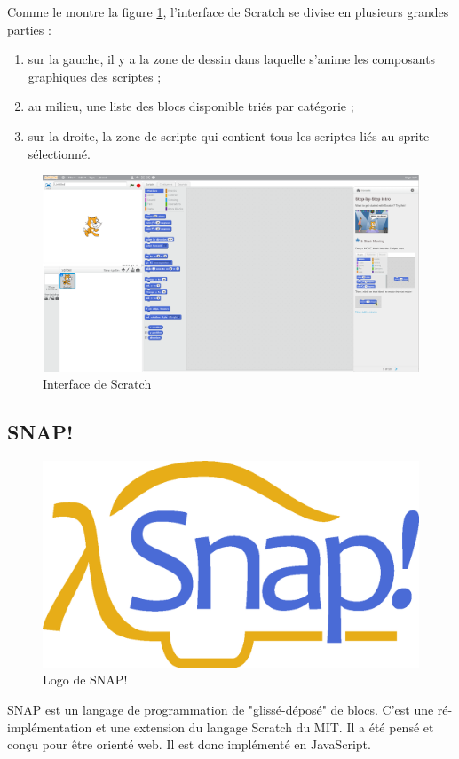Comme le montre la figure \ref{fig:scratch-printscreen}, l'interface de Scratch se divise en plusieurs grandes parties :
\begin{enumerate}
\item sur la gauche, il y a la zone de dessin dans laquelle s'anime les composants graphiques des scriptes ;
\item au milieu, une liste des blocs disponible triés par catégorie ;
\item sur la droite, la zone de scripte qui contient tous les scriptes liés au sprite sélectionné.
\end{enumerate}
\begin{figure}[!h]
  \begin{center}
    \includegraphics[scale=0.2]{content/5-related_work/images/scratch-printscreen}
    \caption{Interface de Scratch}
    \label{fig:scratch-printscreen}
  \end{center}
\end{figure}

\subsection{SNAP!}
\begin{figure}[!h]
  \begin{center}
    \includegraphics[scale=0.07]{content/5-related_work/images/snap}
    \caption{Logo de SNAP!}
    \label{fig:snap}
  \end{center}
\end{figure}
SNAP est un langage de programmation de "glissé-déposé" de blocs. C'est une ré-implémentation et une extension du langage Scratch du MIT. Il a été pensé et conçu pour être orienté web. Il est donc implémenté en JavaScript.\\

